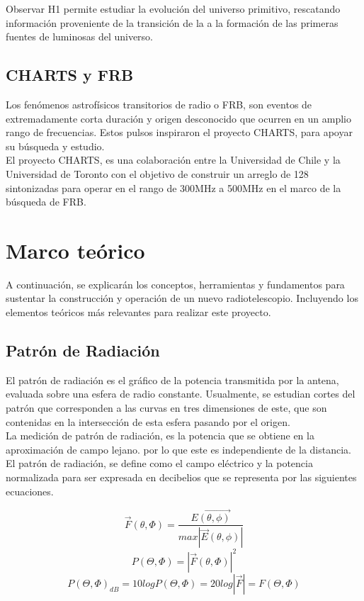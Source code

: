 Observar H1 permite estudiar la evolución del universo primitivo, rescatando información proveniente de la transición de la  a la formación de las primeras fuentes de luminosas del universo.

\subsection{CHARTS y FRB}

Los fenómenos astrofísicos transitorios de radio o FRB, son eventos de extremadamente corta duración y origen desconocido que ocurren en un amplio rango de frecuencias. Estos pulsos inspiraron el proyecto CHARTS, para apoyar su búsqueda y estudio.\\

El proyecto CHARTS, es una colaboración entre la Universidad de Chile y la Universidad de Toronto con el objetivo de construir un arreglo de 128 sintonizadas para operar en el rango de 300MHz a 500MHz en el marco de la búsqueda de FRB.
\section{Marco teórico}
A continuación, se explicarán los conceptos, herramientas y fundamentos para sustentar la construcción y operación de un nuevo radiotelescopio. Incluyendo los elementos teóricos más relevantes para realizar este proyecto.

\subsection{Patrón de Radiación}

El patrón de radiación es el gráfico de la potencia transmitida por la antena, evaluada sobre una esfera de radio constante\cite{Astudillo2014}. Usualmente, se estudian cortes del patrón que corresponden a las curvas en tres dimensiones de este, que son contenidas en la intersección de esta esfera pasando por el origen.\\

La medición de patrón de radiación, es la potencia que se obtiene en la aproximación de campo lejano. por lo que este es independiente de la distancia. El patrón de radiación, se define como el campo eléctrico y la potencia normalizada para ser expresada en decibelios que se representa por las siguientes ecuaciones.

\begin{equation}
    \Vec{F}(\theta, \Phi)=\frac{\Vec{E(\theta, \phi)}}{max|\Vec{E}(\theta, \phi)|}
\end{equation}
\begin{equation}
    P(\Theta, \Phi) = |\Vec{F}(\theta, \Phi)|^{2}
\end{equation}
\begin{equation}
    P(\Theta, \Phi)_{dB} = 10logP(\Theta, \Phi)=20log |\Vec{F}|=F(\Theta, \Phi)
\end{equation}

